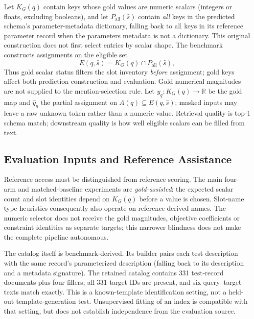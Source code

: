 \documentclass[pdflatex,iicol,sn-basic,Numbered]{sn-jnl}
\begin{document}
Let $K_G(q)$ contain keys whose gold values are numeric scalars (integers or floats, excluding booleans), and let $P_{\mathrm{all}}(\hat{s})$ contain \emph{all} keys in the predicted schema's parameter-metadata dictionary, falling back to all keys in its reference parameter record when the parameters metadata is not a dictionary. This original construction does not first select entries by scalar shape. The benchmark constructs assignments on the eligible set
\begin{equation}
E(q,\hat{s}) = K_G(q) \cap P_{\mathrm{all}}(\hat{s}),
\label{eq:eligible_slots}
\end{equation}
Thus gold scalar status filters the slot inventory \emph{before} assignment; gold keys affect both prediction construction and evaluation. Gold numerical magnitudes are not supplied to the mention-selection rule. Let $y_q : K_G(q) \to \mathbb{R}$ be the gold map and $\hat{y}_{q}$ the partial assignment on $A(q) \subseteq E(q,\hat{s})$; masked inputs may leave a raw unknown token rather than a numeric value. Retrieval quality is top-1 schema match; downstream quality is how well eligible scalars can be filled from text.

\subsection{Evaluation Inputs and Reference Assistance}
\label{subsec:assistance-setting}

Reference access must be distinguished from reference scoring. The main four-arm and matched-baseline experiments are \emph{gold-assisted}: the expected scalar count and slot identities depend on $K_G(q)$ before a value is chosen. Slot-name type heuristics consequently also operate on reference-derived names. The numeric selector does not receive the gold magnitudes, objective coefficients or constraint identities as separate targets; this narrower blindness does not make the complete pipeline autonomous.

The catalog itself is benchmark-derived. Its builder pairs each test description with the same record's parameterized description (falling back to its description and a metadata signature). The retained catalog contains 331 test-record documents plus four fillers; all 331 target IDs are present, and six query--target texts match exactly. This is a known-template identification setting, not a held-out template-generation test. Unsupervised fitting of an index is compatible with that setting, but does not establish independence from the evaluation source.
\end{document}
